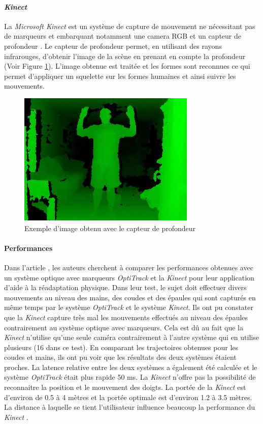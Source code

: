 \paragraph*{\emph{Kinect}}
La \emph{Microsoft Kinect} est un système de capture de mouvement ne nécessitant pas de marqueurs et embarquant notamment une camera RGB et un capteur de profondeur \cite{ze12}. Le capteur de profondeur permet, en utilisant des rayons infrarouges, d'obtenir l'image de la scène en prenant en compte la profondeur (Voir Figure \ref{fig6}). L'image obtenue est traitée et les formes sont reconnues ce qui permet d'appliquer un squelette sur les formes humaines et ainsi suivre les mouvements.
\begin{figure}[!h]
   	\centerline{\includegraphics[scale=1.0]{images/biblio/depthsensor}}
   	\caption{\label{fig6} Exemple d'image obtenu avec le capteur de profondeur}
\end{figure}
\paragraph*{Performances}
Dans l'article \cite{ch12}, les auteurs cherchent à comparer les performances obtenues avec un système optique avec marqueurs \emph{OptiTrack} et la \emph{Kinect} pour leur application d'aide à la réadaptation physique. Dans leur test, le sujet doit effectuer divers mouvements au niveau des mains, des coudes et des épaules qui sont capturés en même temps par le système \emph{OptiTrack} et le système \emph{Kinect}. Ils ont pu constater que la \emph{Kinect} capture très mal les mouvements effectués au niveau des épaules contrairement au système optique avec marqueurs. Cela est dû au fait que la \emph{Kinect} n'utilise qu'une seule caméra contrairement à l'autre système qui en utilise plusieurs (16 dans ce test). En comparant les trajectoires obtenues pour les coudes et mains, ils ont pu voir que les résultats des deux systèmes étaient proches. La latence relative entre les deux systèmes a également été calculée et le système \emph{OptiTrack} était plus rapide 50 ms. La \emph{Kinect} n'offre pas la possibilité de reconnaitre la position et le mouvement des doigts. La portée de la \emph{Kinect} est d'environ de 0.5 à 4 mètres et la portée optimale est d'environ 1.2 à 3.5 mètres. La distance à laquelle se tient l'utilisateur influence beaucoup la performance du \emph{Kinect} \cite{li12}.

